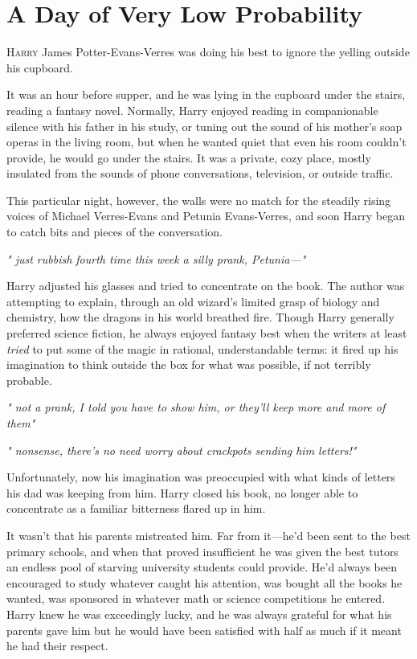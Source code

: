 
\chapter{A Day of Very Low Probability}

\lettrine{H}{arry} James Potter-Evans-Verres was doing his best to
ignore the yelling outside his cupboard.

It was an hour before supper, and he was lying in the
cupboard under the stairs, reading a fantasy novel.
Normally, Harry enjoyed reading in companionable silence with
his father in his study, or tuning out the sound of his
mother's soap operas in the living room, but when he
wanted quiet that even his room couldn't provide, he
would go under the stairs. It was a private, cozy place,
mostly insulated from the sounds of phone conversations,
television, or outside traffic.

This particular night, however, the walls were no match for
the steadily rising voices of Michael Verres-Evans and Petunia
Evans-Verres, and soon Harry began to catch bits and
pieces of the conversation.

\emph{"{\el} just rubbish{\el} fourth time this week{\el} a silly prank,
Petunia—"}

Harry adjusted his glasses and tried to concentrate on the
book. The author was attempting to explain, through an
old wizard's limited grasp of biology and chemistry, how
the dragons in his world breathed fire. Though Harry
generally preferred science fiction, he always enjoyed
fantasy best when the writers at least \emph{tried} to put some
of the magic in rational, understandable terms: it fired up
his imagination to think outside the box for what was
possible, if not terribly probable.

\emph{"{\el} not a prank, I told you{\el} have to show him, or they'll
keep{\el} more and more of them{\el}"}

\emph{"{\el} nonsense, there's no need{\el} worry about crackpots
sending him letters!"}

Unfortunately, now his imagination was preoccupied with
what kinds of letters his dad was keeping from him. Harry
closed his book, no longer able to concentrate as a familiar
bitterness flared up in him.

It wasn't that his parents mistreated him. Far from it—he'd
been sent to the best primary schools, and when that
proved insufficient he was given the best tutors an endless
pool of starving university students could provide. He'd
always been encouraged to study whatever caught his
attention, was bought all the books he wanted, was
sponsored in whatever math or science competitions he
entered. Harry knew he was exceedingly lucky, and he was
always grateful for what his parents gave him{\el} but he
would have been satisfied with half as much if it meant he
had their respect.

